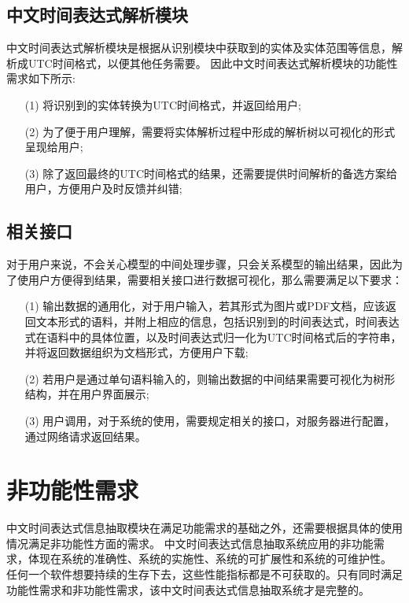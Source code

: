 \subsection{中文时间表达式解析模块}

中文时间表达式解析模块是根据从识别模块中获取到的实体及实体范围等信息，解析成UTC时间格式，以便其他任务需要。
因此中文时间表达式解析模块的功能性需求如下所示:
\begin{enumerate}
    \item[(1)] 将识别到的实体转换为UTC时间格式，并返回给用户;
    \item[(2)] 为了便于用户理解，需要将实体解析过程中形成的解析树以可视化的形式呈现给用户;
    \item[(3)] 除了返回最终的UTC时间格式的结果，还需要提供时间解析的备选方案给用户，方便用户及时反馈并纠错;
\end{enumerate}

\subsection{相关接口}

对于用户来说，不会关心模型的中间处理步骤，只会关系模型的输出结果，因此为了使用户方便得到结果，需要相关接口进行数据可视化，那么需要满足以下要求：
\begin{enumerate}
    \item[(1)] 输出数据的通用化，对于用户输入，若其形式为图片或PDF文档，应该返回文本形式的语料，并附上相应的信息，包括识别到的时间表达式，时间表达式在语料中的具体位置，以及时间表达式归一化为UTC时间格式后的字符串，并将返回数据组织为文档形式，方便用户下载;
    \item[(2)] 若用户是通过单句语料输入的，则输出数据的中间结果需要可视化为树形结构，并在用户界面展示;
    \item[(3)]  用户调用，对于系统的使用，需要规定相关的接口，对服务器进行配置，通过网络请求返回结果。
\end{enumerate}

\section{非功能性需求}

中文时间表达式信息抽取模块在满足功能需求的基础之外，还需要根据具体的使用情况满足非功能性方面的需求。
中文时间表达式信息抽取系统应用的非功能需求，体现在系统的准确性、系统的实施性、系统的可扩展性和系统的可维护性。
任何一个软件想要持续的生存下去，这些性能指标都是不可获取的。只有同时满足功能性需求和非功能性需求，该中文时间表达式信息抽取系统才是完整的。

